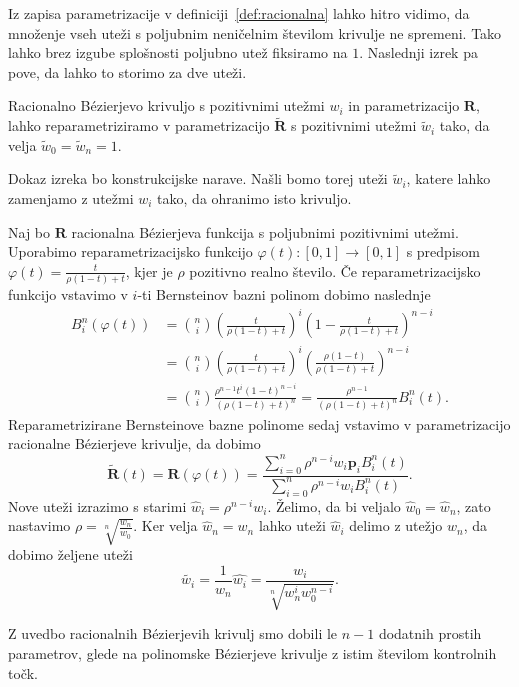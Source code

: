 \documentclass[isrm2, tisk]{fmfdelo}
\newcommand{\p}{\mathbf{p}}
\begin{document}
    Iz zapisa parametrizacije v definiciji~\ref{def:racionalna} lahko hitro vidimo, da množenje vseh uteži s poljubnim neničelnim številom krivulje ne spremeni.
    Tako lahko brez izgube splošnosti poljubno utež fiksiramo na $1$.
    Naslednji izrek pa pove, da lahko to storimo za dve uteži.
    \begin{izrek}
        \label{izrek:racionalne-utezi-1}
        Racionalno Bézierjevo krivuljo s pozitivnimi utežmi $w_i$ in parametrizacijo $\mathbf{R}$, lahko reparametriziramo v parametrizacijo $\mathbf{\tilde{R}}$ s pozitivnimi utežmi $\tilde{w}_i$ tako, da velja $\tilde{w}_0=\tilde{w}_{n}=1.$
    \end{izrek}
    \noindent Dokaz izreka bo konstrukcijske narave.
    Našli bomo torej uteži $\tilde{w}_i$, katere lahko zamenjamo z utežmi $w_i$ tako, da ohranimo isto krivuljo.
    \begin{dokaz}
        Naj bo $\mathbf{R}$ racionalna Bézierjeva funkcija s poljubnimi pozitivnimi utežmi.
        Uporabimo reparametrizacijsko funkcijo $\varphi(t):[0,1]\to[0,1]$ s predpisom $\varphi(t)=\frac{t}{\rho(1-t)+t}$, kjer je $\rho$ pozitivno realno število.
        Če reparametrizacijsko funkcijo vstavimo v $i$-ti Bernsteinov bazni polinom dobimo naslednje
        \begin{align*}
            B^n_i(\varphi(t)) &=  \binom{n}{i}\left(\frac{t}{\rho (1-t)+t}\right)^i\left(1-\frac{t}{\rho (1-t)+t}\right)^{n-i} \\
            &=  \binom{n}{i}\left(\frac{t}{\rho (1-t)+t}\right)^i\left(\frac{\rho(1-t)}{\rho (1-t)+t}\right)^{n-i} \\
            &= \binom{n}{i}\frac{\rho^{n-1}t^{i}(1-t)^{n-i}}{(\rho(1-t)+t)^n} =  \frac{\rho^{n-1}}{(\rho(1-t)+t)^n}B^n_i(t).
        \end{align*}
        Reparametrizirane Bernsteinove bazne polinome sedaj vstavimo v parametrizacijo racionalne Bézierjeve krivulje, da dobimo
        \[\mathbf{\tilde{R}}(t)=\mathbf{R}(\varphi(t)) = \frac{\sum^{n}_{i=0}\rho^{n-i}w_i\p_i B^n_i(t)}{\sum^{n}_{i=0}\rho^{n-i}w_i B^n_i(t)}. \]
        Nove uteži izrazimo s starimi $\hat{w}_i=\rho^{n-i}w_i$.
        Želimo, da bi veljalo $\hat{w}_0=\hat{w}_n$, zato nastavimo $\rho= \sqrt[n]{\frac{w_n}{w_0}}$.
        Ker velja $\hat{w}_n=w_n$ lahko uteži $\hat{w}_i$ delimo z utežjo $w_n$, da dobimo željene uteži \[\tilde{w_i}=\frac{1}{w_n}\hat{w_i} = \frac{w_i}{\sqrt[n]{w^{i}_nw_0^{n-i}}}.\]
    \end{dokaz}
    \begin{posledica}
        Z uvedbo racionalnih Bézierjevih krivulj smo dobili le $n-1$ dodatnih prostih parametrov, glede na polinomske Bézierjeve krivulje z istim številom kontrolnih točk.
    \end{posledica}
\end{document}
